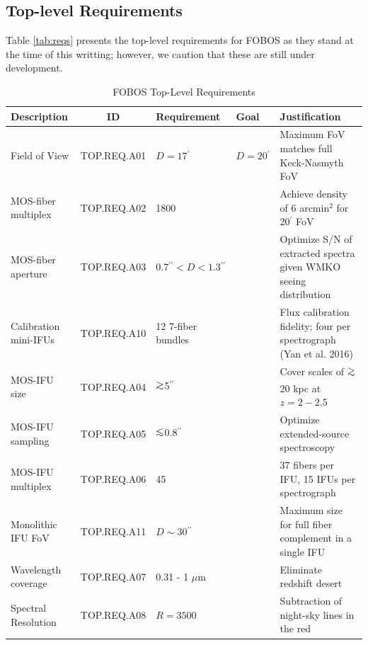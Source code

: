 \documentclass[oneside,11pt]{amsart}
\newcommand{\arcmin}{\mbox{$^{\prime}$}}
\newcommand{\arcsec}{\mbox{$^{\prime\prime}$}}
\DeclareRobustCommand{\gtrsim}{%
\mathrel{\hskip-.5em\begin{array}{c}>\\[-8pt]\sim\end{array}\hskip-.5em}}
\DeclareRobustCommand{\lesssim}{%
\mathrel{\hskip-.5em\begin{array}{c}<\\[-8pt]\sim\end{array}\hskip-.5em}}
\begin{document}

\subsection{Top-level Requirements}

Table \ref{tab:reqs} presents the top-level requirements for FOBOS as
they stand at the time of this writting; however, we caution that
these are still under development.

\begin{table}[h!]
\centering
\begin{threeparttable}
\caption{FOBOS Top-Level Requirements}
\footnotesize
\begin{tabular}{| l | c | p{2.5cm} | p{1.5cm} | p{4cm} |}
\hline
{\bf Description} & {\bf ID} & {\bf Requirement} & {\bf Goal} & {\bf Justification} \\
\hline
\hline
Field of View & TOP.REQ.A01 & $D=17\arcmin$ & $D=20\arcmin$ & Maximum FoV matches full Keck-Nasmyth FoV \\
\hline
MOS-fiber multiplex & TOP.REQ.A02 & 1800 &  & Achieve density of 6 arcmin$^2$ for $20\arcmin$ FoV \\
\hline
MOS-fiber aperture & TOP.REQ.A03 & $0.7\arcsec < D < 1.3\arcsec$ &  & Optimize S/N of extracted spectra given WMKO seeing distribution \\
\hline
Calibration mini-IFUs & TOP.REQ.A10 & 12 7-fiber bundles & & Flux calibration fidelity; four per spectrograph (Yan et al. 2016) \\
\hline
MOS-IFU size & TOP.REQ.A04 & $\gtrsim$5\arcsec &  & Cover scales of $\gtrsim$20 kpc at $z=2-2.5$ \\
\hline
MOS-IFU sampling & TOP.REQ.A05 & $\lesssim$0.8\arcsec & & Optimize extended-source spectroscopy \\
\hline
MOS-IFU multiplex & TOP.REQ.A06 & 45 & & 37 fibers per IFU, 15 IFUs per spectrograph \\
\hline
Monolithic IFU FoV & TOP.REQ.A11 & $D\sim$30\arcsec & & Maximum size for full fiber complement in a single IFU \\
\hline
Wavelength coverage & TOP.REQ.A07 & 0.31 - 1 $\mu$m & & Eliminate redshift desert \\
\hline
Spectral Resolution & TOP.REQ.A08 & $R = 3500$ & & Subtraction of night-sky lines in the red \\

\end{tabular}
\end{threeparttable}
\end{table}
\end{document}
